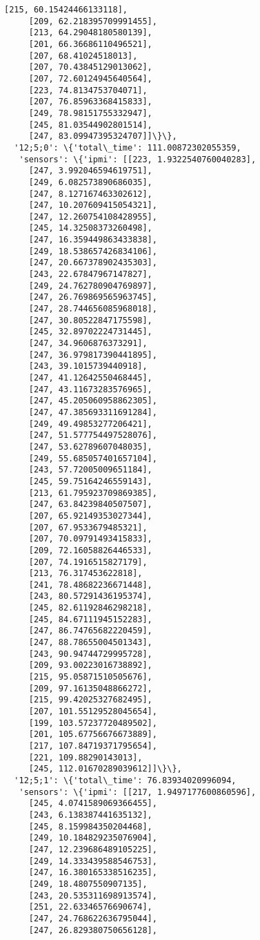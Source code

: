 \documentclass[11pt]{article}
\begin{document}
\begin{tcolorbox}[breakable, size=fbox, boxrule=.5pt, pad at break*=1mm, opacityfill=0]
\begin{Verbatim}[commandchars=\\\{\}]
     [215, 60.15424466133118],
     [209, 62.218395709991455],
     [213, 64.29048180580139],
     [201, 66.36686110496521],
     [207, 68.41024518013],
     [207, 70.43845129013062],
     [207, 72.60124945640564],
     [223, 74.8134753704071],
     [207, 76.85963368415833],
     [249, 78.98151755332947],
     [245, 81.03544902801514],
     [247, 83.09947395324707]]\}\},
  '12;5;0': \{'total\_time': 111.00872302055359,
   'sensors': \{'ipmi': [[223, 1.9322540760040283],
     [247, 3.992046594619751],
     [249, 6.082573890686035],
     [247, 8.127167463302612],
     [247, 10.207609415054321],
     [247, 12.260754108428955],
     [245, 14.32508373260498],
     [247, 16.359449863433838],
     [249, 18.538657426834106],
     [247, 20.667378902435303],
     [243, 22.67847967147827],
     [249, 24.762780904769897],
     [247, 26.769869565963745],
     [247, 28.744656085968018],
     [247, 30.80522847175598],
     [245, 32.89702224731445],
     [247, 34.9606876373291],
     [247, 36.979817390441895],
     [243, 39.1015739440918],
     [247, 41.12642550468445],
     [247, 43.11673283576965],
     [247, 45.205060958862305],
     [247, 47.385693311691284],
     [249, 49.49853277206421],
     [247, 51.577754497528076],
     [247, 53.62789607048035],
     [249, 55.685057401657104],
     [243, 57.72005009651184],
     [245, 59.75164246559143],
     [213, 61.795923709869385],
     [247, 63.84239840507507],
     [207, 65.92149353027344],
     [207, 67.9533679485321],
     [207, 70.09791493415833],
     [209, 72.16058826446533],
     [207, 74.1916515827179],
     [213, 76.317453622818],
     [241, 78.48682236671448],
     [243, 80.57291436195374],
     [245, 82.61192846298218],
     [245, 84.67111945152283],
     [247, 86.74765682220459],
     [247, 88.78655004501343],
     [243, 90.94744729995728],
     [209, 93.00223016738892],
     [215, 95.05871510505676],
     [209, 97.16135048866272],
     [215, 99.42025327682495],
     [207, 101.55129528045654],
     [199, 103.57237720489502],
     [201, 105.67756676673889],
     [217, 107.84719371795654],
     [221, 109.88290143013],
     [245, 112.01670289039612]]\}\},
  '12;5;1': \{'total\_time': 76.83934020996094,
   'sensors': \{'ipmi': [[217, 1.9497177600860596],
     [245, 4.0741589069366455],
     [243, 6.138387441635132],
     [245, 8.159984350204468],
     [249, 10.184829235076904],
     [247, 12.239686489105225],
     [249, 14.333439588546753],
     [247, 16.380165338516235],
     [249, 18.4807550907135],
     [243, 20.535311698913574],
     [251, 22.63346576690674],
     [247, 24.768622636795044],
     [247, 26.829380750656128],

\end{Verbatim}
\end{tcolorbox}
\end{document}
